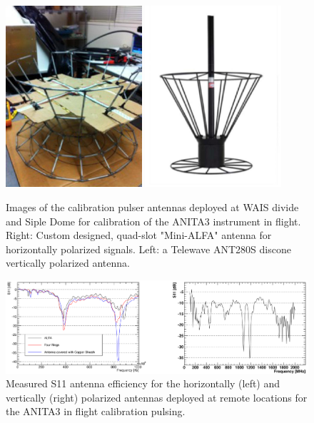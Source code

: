 	\begin{figure}
		\includegraphics[width=0.45\textwidth]{figures/waisPulserAntennaH}
		\includegraphics[width=0.45\textwidth]{figures/waisPulserAntennaV}
		\caption{Images of the calibration pulser antennas deployed at WAIS divide and Siple Dome for calibration of the ANITA3 instrument in flight.  Right: Custom designed, quad-slot "Mini-ALFA" antenna for horizontally polarized signals.  Left: a Telewave ANT280S discone vertically polarized antenna. \cite{StephCalPulserPresentation}}
		\label{fig:waisPulserAntenna}
	\end{figure}	
	
	\begin{figure}
		\includegraphics[width=\textwidth]{figures/waisPulserAntennaSpectrum}
		\caption{Measured S11 antenna efficiency for the horizontally (left) and vertically (right) polarized antennas deployed at remote locations for the ANITA3 in flight calibration pulsing. \cite{StephCalPulserPresentation}}
		\label{fig:waisPulserAntennaResponse}
	\end{figure}
	

